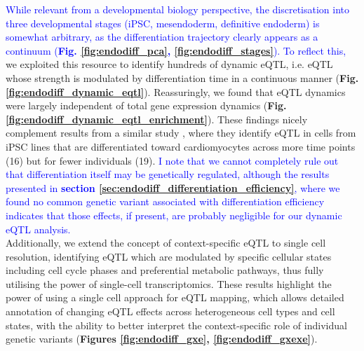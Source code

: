\textcolor{blue}{While relevant from a developmental biology perspective, the discretisation into three developmental stages (iPSC, mesendoderm, definitive endoderm) is somewhat arbitrary, as the differentiation trajectory clearly appears as a continuum (\textbf{Fig. \ref{fig:endodiff_pca}, \ref{fig:endodiff_stages}}).
To reflect this,} we exploited this resource to identify hundreds of dynamic eQTL, i.e. eQTL whose strength is modulated by differentiation time in a continuous manner (\textbf{Fig. \ref{fig:endodiff_dynamic_eqtl}}).
Reassuringly, we found that eQTL dynamics were largely independent of total gene expression dynamics (\textbf{Fig. \ref{fig:endodiff_dynamic_eqtl_enrichment}}).
These findings nicely complement results from a similar study \cite{strober2019dynamic}, where they identify eQTL in cells from iPSC lines that are differentiated toward cardiomyocytes across more time points (16) but for fewer individuals (19).
\textcolor{blue}{I note that we cannot completely rule out that differentiation itself may be genetically regulated, although the results presented in \textbf{section \ref{sec:endodiff_differentiation_efficiency}}, where we found no common genetic variant associated with differentiation efficiency indicates that those effects, if present, are probably negligible for our dynamic eQTL analysis. }\\

Additionally, we extend the concept of context-specific eQTL \cite{fairfax2012genetics, fairfax2014innate, knowles2017allele} to single cell resolution, identifying eQTL which are modulated by specific cellular states including cell cycle phases and preferential metabolic pathways, thus fully utilising the power of single-cell transcriptomics.
These results highlight the power of using a single cell approach for eQTL mapping, which allows detailed annotation of changing eQTL effects across heterogeneous cell types and cell states, with the ability to better interpret the context-specific role of individual genetic variants (\textbf{Figures \ref{fig:endodiff_gxe}, \ref{fig:endodiff_gxexe}}). \\

